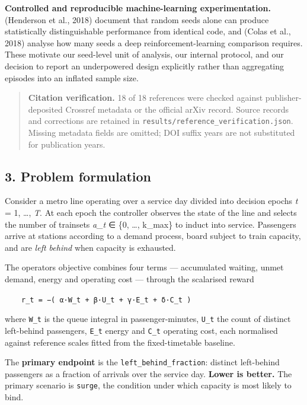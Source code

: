 \documentclass[
]{article}
\begin{document}
\textbf{Controlled and reproducible machine-learning experimentation.}
(Henderson et al., 2018) document that random seeds alone can produce
statistically distinguishable performance from identical code, and
(Colas et al., 2018) analyse how many seeds a deep
reinforcement-learning comparison requires. These motivate our
seed-level unit of analysis, our internal protocol, and our decision to
report an underpowered design explicitly rather than aggregating
episodes into an inflated sample size.

\begin{quote}
\textbf{Citation verification.} 18 of 18 references were checked against
publisher-deposited Crossref metadata or the official arXiv record.
Source records and corrections are retained in
\texttt{results/reference\_verification.json}. Missing metadata fields
are omitted; DOI suffix years are not substituted for publication years.
\end{quote}

\subsection{3. Problem formulation}\label{3-problem-formulation}

Consider a metro line operating over a service day divided into decision
epochs \emph{t} = 1, \ldots, \emph{T}. At each epoch the controller
observes the state of the line and selects the number of trainsets
\emph{a\_t} ∈ \{0, \ldots, k\_max\} to induct into service. Passengers
arrive at stations according to a demand process, board subject to train
capacity, and are \emph{left behind} when capacity is exhausted.

The operator\textquotesingle s objective combines four terms ---
accumulated waiting, unmet demand, energy and operating cost --- through
the scalarised reward

~~~~\texttt{r\_t\ =\ −(\ α·W\_t\ +\ β·U\_t\ +\ γ·E\_t\ +\ δ·C\_t\ )}

where \texttt{W\_t} is the queue integral in passenger-minutes,
\texttt{U\_t} the count of distinct left-behind passengers,
\texttt{E\_t} energy and \texttt{C\_t} operating cost, each normalised
against reference scales fitted from the fixed-timetable baseline.

The \textbf{primary endpoint} is the \texttt{left\_behind\_fraction}:
distinct left-behind passengers as a fraction of arrivals over the
service day. \textbf{Lower is better.} The primary scenario is
\texttt{surge}, the condition under which capacity is most likely to
bind.
\end{document}
